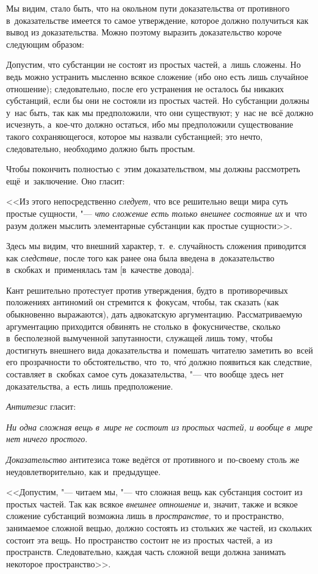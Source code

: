 Мы видим, стало быть, что на окольном пути доказательства от
противного в~доказательстве имеется то самое утверждение, которое
должно получиться как вывод из доказательства. Можно поэтому
выразить доказательство короче следующим образом:

Допустим, что субстанции не состоят из простых частей, а~лишь сложены.
Но ведь можно устранить мысленно всякое сложение (ибо оно есть лишь случайное
отношение); следовательно, после его устранения не осталось бы никаких
субстанций, если бы они не состояли из простых частей. Но субстанции должны
у~нас быть, так как мы предположили, что они существуют; у~нас не~всё должно
исчезнуть, а~кое-что должно остаться, ибо мы предположили существование такого
сохраняющегося, которое мы назвали субстанцией; это нечто, следовательно,
необходимо должно быть простым.

Чтобы покончить полностью с~этим доказательством, мы должны рассмотреть
ещё~и~заключение. Оно гласит:

<<Из этого непосредственно {\em следует,} что все решительно вещи мира суть
простые сущности, "--- {\em что сложение есть только внешнее состояние их}
и~что разум должен мыслить элементарные субстанции как простые сущности>>.

Здесь мы видим, что внешний характер, т.~е. случайность сложения приводится
как {\em следствие,} после того как ранее она была введена в~доказательство
в~скобках и~применялась там [в~качестве довода].

Кант решительно протестует против утверждения, будто в~противоречивых
положениях антиномий он стремится к~фокусам, чтобы, так сказать (как
обыкновенно выражаются), дать адвокатскую аргументацию. Рассматриваемую
аргументацию приходится обвинять не столько в~фокусничестве, сколько
в~бесполезной вымученной запутанности, служащей лишь тому, чтобы достигнуть
внешнего вида доказательства и~помешать читателю заметить во~всей его
прозрачности то обстоятельство, что~то, чт\'{о} должно появиться как следствие,
составляет в~скобках самое суть доказательства, "--- что вообще здесь
нет доказательства, а~есть лишь предположение.

{\em Антитезис} гласит:

{\em Ни одна сложная вещь в~мире не состоит из простых частей,
и вообще в~мире нет ничего простого}.

{\em Доказательство} антитезиса тоже ведётся от противного и~по-своему
столь же неудовлетворительно, как и~предыдущее.

<<Допустим, "--- читаем мы, "--- что сложная вещь как субстанция состоит из
простых частей. Так как всякое {\em внешнее отношение} и, значит, также и
всякое сложение субстанций возможна лишь в {\em пространстве,} то
и пространство, занимаемое сложной вещью, должно состоять из стольких же
частей, из скольких состоит эта вещь. Но пространство состоит не из простых
частей, а~из пространств. Следовательно, каждая часть сложной вещи должна занимать
некоторое пространство>>.

